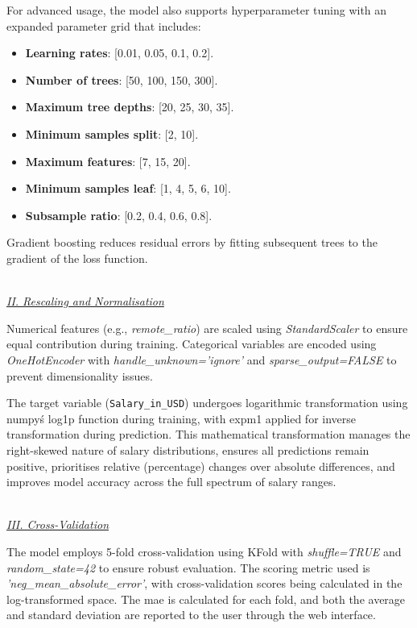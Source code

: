 \documentclass[11pt,a4paper]{article}
\newcommand{\subsubsubsection}[1]{
  {\setlength\itemindent{13pt} \textit{\uline{\\#1\\}}} 
}
\begin{document}
For advanced usage, the model also supports hyperparameter tuning with an expanded parameter grid that includes:
\begin{itemize}
\item \textbf{Learning rates}: [0.01, 0.05, 0.1, 0.2].
\item \textbf{Number of trees}: [50, 100, 150, 300].
\item \textbf{Maximum tree depths}: [20, 25, 30, 35].
\item \textbf{Minimum samples split}: [2, 10].
\item \textbf{Maximum features}: [7, 15, 20].
\item \textbf{Minimum samples leaf}: [1, 4, 5, 6, 10].
\item \textbf{Subsample ratio}: [0.2, 0.4, 0.6, 0.8].
\end{itemize}

Gradient boosting reduces residual errors by fitting subsequent trees to the gradient of the loss function.

\subsubsubsection{II. Rescaling and Normalisation}
Numerical features (e.g., \textit{remote\_ratio}) are scaled using \textit{StandardScaler} to ensure equal contribution during training. Categorical variables are encoded using \textit{OneHotEncoder} with \textit{handle\_unknown='ignore'} and \textit{sparse\_output=FALSE} to prevent dimensionality issues.

The target variable (\texttt{Salary\_in\_USD}) undergoes logarithmic transformation using numpy\'s log1p function during training, with expm1 applied for inverse transformation during prediction. This mathematical transformation manages the right-skewed nature of salary distributions, ensures all predictions remain positive, prioritises relative (percentage) changes over absolute differences, and improves model accuracy across the full spectrum of salary ranges.

\subsubsubsection{III. Cross-Validation}
The model employs 5-fold cross-validation using KFold with \textit{shuffle=TRUE} and \textit{random\_state=42} to ensure robust evaluation. The scoring metric used is \textit{'neg\_mean\_absolute\_error'}, with cross-validation scores being calculated in the log-transformed space. The \acrshort{mae} is calculated for each fold, and both the average and standard deviation are reported to the user through the web interface.
\end{document}
